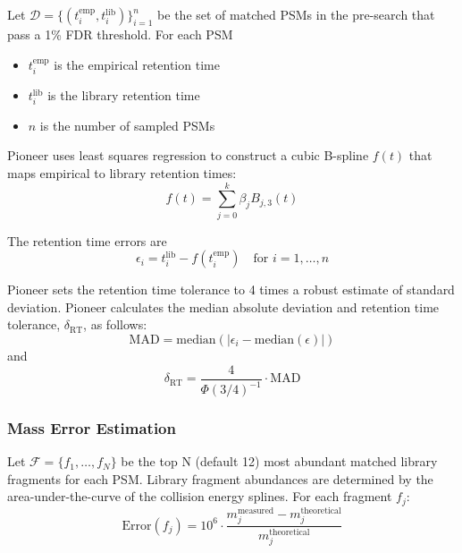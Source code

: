 \documentclass[pdflatex,sn-nature]{sn-jnl}
\begin{document}
Let $\mathcal{D} = \{(t_i^{\text{emp}}, t_i^{\text{lib}})\}_{i=1}^{n}$ be the set of matched PSMs in the pre-search that pass a 1\% FDR threshold. For each PSM
\begin{itemize}
    \item $t_i^{\text{emp}}$ is the empirical retention time
    \item $t_i^{\text{lib}}$ is the library retention time
    \item $n$ is the number of sampled PSMs
\end{itemize}

Pioneer uses least squares regression to construct a cubic B-spline $f(t)$ that maps empirical to library retention times:
\begin{equation}
    f(t) = \sum_{j=0}^{k} \beta_j B_{j,3}(t)
\end{equation}

The retention time errors are
\begin{equation}
    \epsilon_i = t_i^{\text{lib}} - f(t_i^{\text{emp}}) \quad \text{for } i = 1,\ldots,n
\end{equation}

Pioneer sets the retention time tolerance to 4 times a robust estimate of standard deviation. Pioneer calculates the median absolute deviation and retention time tolerance, $\delta_{\text{RT}}$, as follows:
\begin{equation} \text{MAD} = \text{median}\left(|\epsilon_i - \text{median}(\epsilon)|\right) \end{equation}
and 
\begin{equation}
    \delta_{\text{RT}} = \frac{4}{\Phi(3/4)^{-1}} \cdot \text{MAD}
\end{equation}

\subsubsection{Mass Error Estimation}\label{subsubsec:mass-error-estimation}
Let $\mathcal{F} = \{f_1, \ldots, f_N\}$ be the top N (default 12) most abundant matched library fragments for each PSM. Library fragment abundances are determined by the area-under-the-curve of the collision energy splines. For each fragment $f_j$:
\begin{equation}
    \text{Error}(f_j) = 10^6 \cdot \frac{m_j^{\text{measured}} - m_j^{\text{theoretical}}}{m_j^{\text{theoretical}}}
\end{equation}
\end{document}
